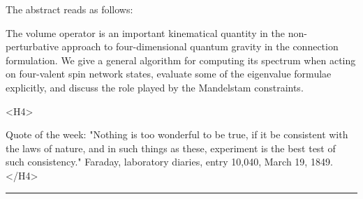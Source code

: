 The abstract reads as follows:

The volume operator is an important kinematical quantity in the
non-perturbative approach to four-dimensional quantum gravity in the
connection formulation. We give a general algorithm for computing its
spectrum when acting on four-valent spin network states, evaluate some
of the eigenvalue formulae explicitly, and discuss the role played by
the Mandelstam constraints.

<H4> 

Quote of the week: "Nothing is too wonderful to be true, if it be
consistent with the laws of nature, and in such things as these,
experiment is the best test of such consistency."  Faraday, laboratory
diaries, entry 10,040, March 19, 1849.
</H4>
\par\noindent\rule{\textwidth}{0.4pt}

